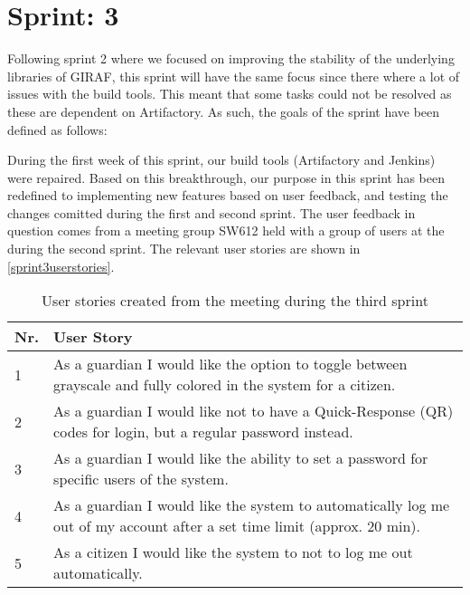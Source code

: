 \chapter{Sprint: 3}
Following sprint 2 where we focused on improving the stability of the underlying
libraries of GIRAF, this sprint will have the same focus since there where a lot
of issues with the build tools. This meant that some tasks could not be resolved
as these are dependent on Artifactory. As such, the goals of the sprint have
been defined as follows:\nl

\nl

\nl

\nl

During the first week of this sprint, our build tools (Artifactory and Jenkins)
were repaired. Based on this breakthrough, our purpose in this sprint has been
redefined to implementing new features based on user feedback, and testing the
changes comitted during the first and second sprint. The user feedback in
question comes from a meeting group SW612 held with a group of users at the
during the second sprint. The relevant user stories are shown in
\autoref{sprint3userstories}.

\begin{table}[H]
\centering 
\begin{tabular}{|l|p{12.5cm}|}
\hline
Nr. & User Story \\\hline
1 & As a guardian I would like the option to toggle between grayscale and fully
colored in the system for a citizen. \\\hline
2 & As a guardian I would like not to have a Quick-Response (QR) codes for
login, but a regular password instead.\\\hline
3 & As a guardian I would like the ability to set a password for specific users
of the system.\\\hline
4 & As a guardian I would like the system to automatically log me out of my
account after a set time limit (approx. 20 min).\\\hline
5 & As a citizen I would like the system to not to log me out
automatically.\\\hline
\end{tabular}
\caption{User stories created from the meeting during the third sprint}
\label{sprint3userstories}
\end{table}


